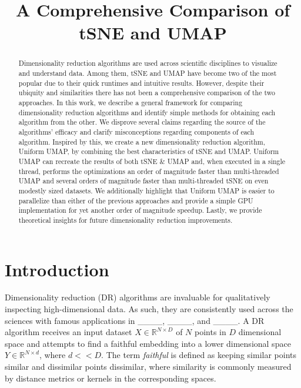 \documentclass{article}
\title{A Comprehensive Comparison of tSNE and UMAP}
\theoremstyle{definition}
\begin{document}
\maketitle

\begin{abstract}
Dimensionality reduction algorithms are used across scientific disciplines to visualize and understand data. Among them, tSNE and UMAP have become two of the most
popular due to their quick runtimes and intuitive results. However, despite their ubiquity and similarities there
has not been a comprehensive comparison of the two approaches. In this work, we describe a general framework for comparing dimensionality reduction algorithms and
identify simple methods for obtaining each algorithm from the other. We disprove several claims regarding the source of the algorithms' efficacy and clarify
misconceptions regarding components of each algorithm. Inspired by this, we create a new dimensionality reduction algorithm, Uniform UMAP, by combining the best characteristics of tSNE
and UMAP. Uniform UMAP can recreate the results of both tSNE \& UMAP and, when executed in a single thread, performs the optimizations an order of magnitude faster than
multi-threaded UMAP and several orders of magnitude faster than multi-threaded tSNE on even modestly sized datasets. We additionally highlight that Uniform UMAP is easier to parallelize than either of the previous approaches and provide
a simple GPU implementation for yet another order of magnitude speedup.
Lastly, we provide theoretical insights for future dimensionality reduction improvements.
\end{abstract}

\section{Introduction}
Dimensionality reduction (DR) algorithms are invaluable for qualitatively inspecting high-dimensional data. As such, they are consistently used across the sciences
with famous applications in \_\_\_\_, \_\_\_\_, and \_\_\_\_. A DR algorithm receives an input dataset $X \in \mathbb{R}^{N \times D}$ of
$N$ points in $D$ dimensional space and
attempts to find a faithful embedding into a lower dimensional space $Y \in \mathbb{R}^{N \times d}$, where $d << D$. The term \textit{faithful} is
defined as keeping similar points similar and dissimilar points dissimilar, where similarity is commonly measured by distance metrics or kernels in the corresponding spaces.
\end{document}
